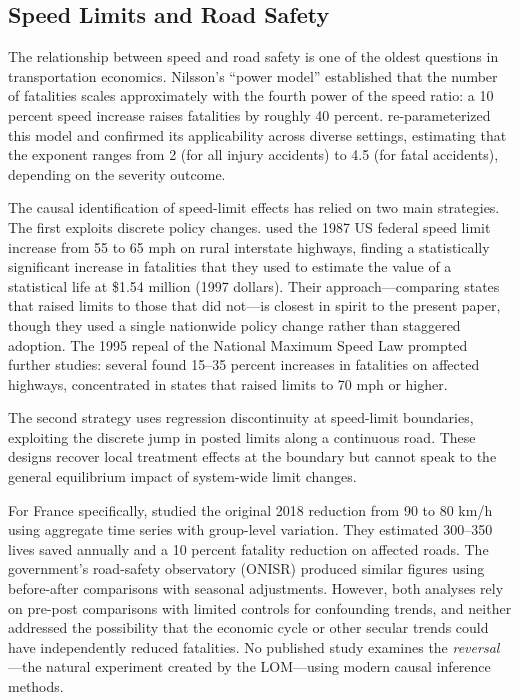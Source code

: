 \documentclass[12pt]{article}
\begin{document}
\subsection{Speed Limits and Road Safety}

The relationship between speed and road safety is one of the oldest questions in transportation economics. Nilsson's ``power model'' \citep{nilsson2004} established that the number of fatalities scales approximately with the fourth power of the speed ratio: a 10 percent speed increase raises fatalities by roughly 40 percent. \citet{elvik2019} re-parameterized this model and confirmed its applicability across diverse settings, estimating that the exponent ranges from 2 (for all injury accidents) to 4.5 (for fatal accidents), depending on the severity outcome.

The causal identification of speed-limit effects has relied on two main strategies. The first exploits discrete policy changes. \citet{ashenfelter2004} used the 1987 US federal speed limit increase from 55 to 65 mph on rural interstate highways, finding a statistically significant increase in fatalities that they used to estimate the value of a statistical life at \$1.54 million (1997 dollars). Their approach---comparing states that raised limits to those that did not---is closest in spirit to the present paper, though they used a single nationwide policy change rather than staggered adoption. The 1995 repeal of the National Maximum Speed Law prompted further studies: several found 15--35 percent increases in fatalities on affected highways, concentrated in states that raised limits to 70 mph or higher.

The second strategy uses regression discontinuity at speed-limit boundaries, exploiting the discrete jump in posted limits along a continuous road. These designs recover local treatment effects at the boundary but cannot speak to the general equilibrium impact of system-wide limit changes.

For France specifically, \citet{carnis2024} studied the original 2018 reduction from 90 to 80 km/h using aggregate time series with group-level variation. They estimated 300--350 lives saved annually and a 10 percent fatality reduction on affected roads. The government's road-safety observatory (ONISR) produced similar figures using before-after comparisons with seasonal adjustments. However, both analyses rely on pre-post comparisons with limited controls for confounding trends, and neither addressed the possibility that the economic cycle or other secular trends could have independently reduced fatalities. No published study examines the \textit{reversal}---the natural experiment created by the LOM---using modern causal inference methods.
\end{document}
